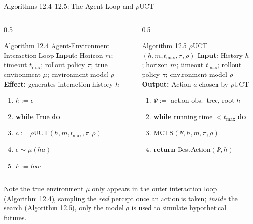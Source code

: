 \documentclass[aspectratio=169,10pt]{beamer}
\begin{document}
\begin{frame}[allowframebreaks]{Algorithms 12.4--12.5: The Agent Loop and $\rho$UCT}
\begin{columns}[T]
\begin{column}{0.5\textwidth}
\begin{block}{Algorithm 12.4 Agent-Environment Interaction Loop}
\footnotesize
\textbf{Input:} Horizon $m$; timeout $t_{\max}$; rollout policy $\pi$; true environment
$\mu$; environment model $\rho$\\
\textbf{Effect:} generates interaction history $h$
\begin{enumerate}
\item[1:] $h:=\epsilon$
\item[2:] \textbf{while} True \textbf{do}
\item[3:] \quad $a:=\rho$UCT$(h,m,t_{\max},\pi,\rho)$
\item[4:] \quad $e\sim\mu(ha)$
\item[5:] \quad $h:=hae$
\end{enumerate}
\end{block}
\end{column}
\begin{column}{0.5\textwidth}
\begin{block}{Algorithm 12.5 $\rho$UCT$(h,m,t_{\max},\pi,\rho)$}
\footnotesize
\textbf{Input:} History $h$; horizon $m$; timeout $t_{\max}$; rollout policy $\pi$;
environment model $\rho$\\
\textbf{Output:} Action $a$ chosen by $\rho$UCT
\begin{enumerate}
\item[1:] $\Psi:=$ action-obs.\ tree, root $h$
\item[2:] \textbf{while} running time $<t_{\max}$ \textbf{do}
\item[3:] \quad MCTS$(\Psi,h,m,\pi,\rho)$
\item[4:] \textbf{return} BestAction$(\Psi,h)$
\end{enumerate}
\end{block}
\end{column}
\end{columns}
\vspace{0.3cm}
Note the true environment $\mu$ only appears in the outer interaction loop (Algorithm
12.4), sampling the \emph{real} percept once an action is taken; \emph{inside} the search
(Algorithm 12.5), only the model $\rho$ is used to simulate hypothetical futures.

\framebreak


\end{frame}
\end{document}
